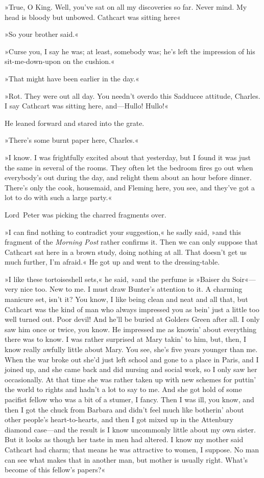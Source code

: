 »True, O King. Well, you've sat on all my discoveries so far. Never mind. My head is bloody but unbowed. Cathcart was sitting here\longdash«

»So your brother said.«

»Curse you, I say he was; at least, somebody was; he's left the impression of his sit-me-down-upon on the cushion.«

»That might have been earlier in the day.«

»Rot. They were out all day. You needn't overdo this Sadducee attitude, Charles. I say Cathcart was sitting here, and—Hullo! Hullo!«

He leaned forward and stared into the grate.

»There's some burnt paper here, Charles.«

»I know. I was frightfully excited about that yesterday, but I found it was just the same in several of the rooms. They often let the bedroom fires go out when everybody's out during the day, and relight them about an hour before dinner. There's only the cook, housemaid, and Fleming here, you see, and they've got a lot to do with such a large party.«

Lord~Peter was picking the charred fragments over.

»I can find nothing to contradict your suggestion,« he sadly said, »and this fragment of the \textit{Morning Post} rather confirms it. Then we can only suppose that Cathcart sat here in a brown study, doing nothing at all. That doesn't get us much further, I'm afraid.« He got up and went to the dressing-table.

»I like these tortoiseshell sets,« he said, »and the perfume is »Baiser du Soir«—very nice too. New to me. I must draw Bunter's attention to it. A charming manicure set, isn't it? You know, I like being clean and neat and all that, but Cathcart was the kind of man who always impressed you as bein' just a little too well turned out. Poor devil! And he'll be buried at Golders Green after all. I only saw him once or twice, you know. He impressed me as knowin' about everything there was to know. I was rather surprised at Mary takin' to him, but, then, I know really awfully little about Mary. You see, she's five years younger than me. When the war broke out she'd just left school and gone to a place in Paris, and I joined up, and she came back and did nursing and social work, so I only saw her occasionally. At that time she was rather taken up with new schemes for puttin' the world to rights and hadn't a lot to say to me. And she got hold of some pacifist fellow who was a bit of a stumer, I fancy. Then I was ill, you know, and then I got the chuck from Barbara and didn't feel much like botherin' about other people's heart-to-hearts, and then I got mixed up in the Attenbury diamond case—and the result is I know uncommonly little about my own sister. But it looks as though her taste in men had altered. I know my mother said Cathcart had charm; that means he was attractive to women, I suppose. No man can see what makes that in another man, but mother is usually right. What's become of this fellow's papers?«

